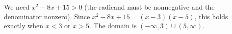 We need $x^2-8x+15>0$ (the radicand must be nonnegative and the denominator nonzero). Since $x^2-8x+15=(x-3)(x-5)$, this holds exactly when $x<3$ or $x>5$. The domain is $\boxed{(-\infty,3)\cup(5,\infty)}$.
